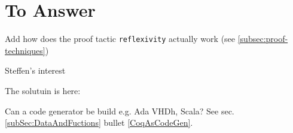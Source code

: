 \section{To Answer}

Add how does the proof tactic \lstinline!reflexivity! actually work \label{sec:reflexivity} (see \ref{subsec:proof-techniques})

Steffen's interest

The solutuin is here: \cite{ExtractingProgrammsinOCAMlandHaskell}

Can a code generator be build e.g. Ada VHDh, Scala? See sec. \ref{subSec:DataAndFuctions} bullet \ref{CoqAsCodeGen}.